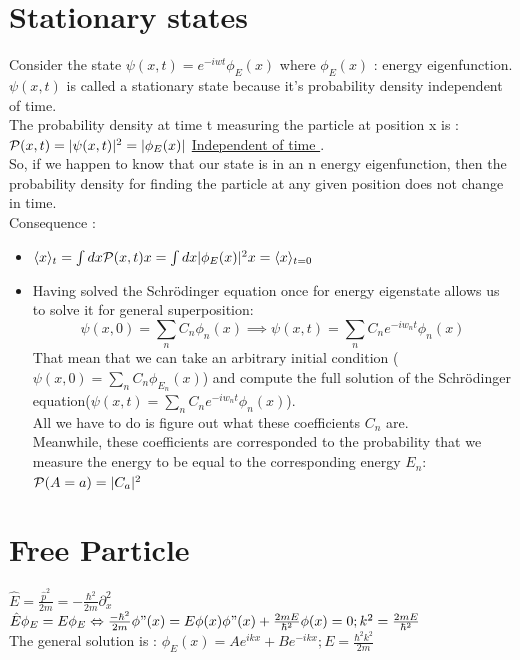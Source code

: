 \documentclass[12pt,oneside]{book}
\begin{document}
\section{Stationary states}
Consider the state $\psi(x,t) = e^{-iwt}\phi_E(x)$ where $\phi_E(x)$ : energy eigenfunction.\\
$\psi(x,t)$ is called a stationary state because it's probability density independent of time.\\
The probability density at time t measuring the particle at position x is :\\
$\mathcal{P}(x,t) = |\psi(x,t)|^2 = |\phi_E(x)|$ \underline{Independent of time }.\\
So, if we happen to know that our state is in an n energy eigenfunction, then the probability density for finding the particle at any given position does not change in time.\\
Consequence :
\begin{itemize}
	\item $\langle x \rangle_{t} = \int dx \mathcal{P}(x,t)x = \int dx |\phi_E(x)|^2x = \langle x \rangle_{t=0} $
	\item Having solved the Schrödinger equation once for energy eigenstate allows us to solve it for general superposition:
	      \[\psi(x,0) = \sum_nC_n\phi_n(x)\implies \psi(x,t)= \sum_nC_ne^{-iw_nt}\phi_n(x)\]
	      That mean that we can take an arbitrary initial condition ($\psi(x,0) = \sum_n C_n\phi_{E_n}(x)$) and compute the full solution of the Schrödinger equation($ \psi(x,t)= \sum_nC_ne^{-iw_nt}\phi_n(x)$).\\
	      All we have to do is figure out what these coefficients $C_n$ are.\\
	      Meanwhile, these coefficients are corresponded to the probability that we measure the energy to be equal to the corresponding energy $E_n$:$\mathcal{P}(A=a) = |C_a|^2$
\end{itemize}
\section{Free Particle}
$\hat{E} = \frac{\hat{p}^2}{2m} = -\frac{\hbar^2}{2m}\partial_x^2$ \\
$\hat{E}\phi_E = E\phi_E \Leftrightarrow \frac{-\hbar^2}{2m}\phi"(x) = E\phi(x) \\
	\phi"(x) + \frac{2mE}{\hbar^2}\phi(x) = 0; k^2 = \frac{2mE}{\hbar^2}$\\
The general solution is : $\phi_E(x) = Ae^{ikx} + Be^{-ikx};E =\frac{\hbar^2k^2}{2m}$
\end{document}
